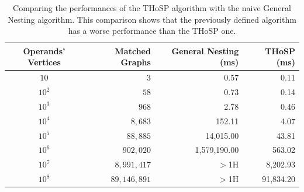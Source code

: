 \begin{table}[!t]
	\centering
\begin{tabular}{@{}cr|rr@{}}
	\toprule
	{\textbf{Operands' Vertices}} & Matched Graphs  & {\textbf{General Nesting} (ms)} & {\textbf{THoSP} (ms)}  \\	
	\midrule
	$10$ & $3$ &  0.57       & 0.11\\
	$10^2$ & $58$  & 0.73        & 0.14\\
	$10^3$  & $968$  & 2.78   & 0.46\\
	$10^4$ & $8,683$   & 152.11   & 4.07\\
	$10^5$ & $88,885$   & 14,015.00 & 43.81 \\
	$10^6$  & $902,020$  &  1,579,190.00      & 563.02\\
	$10^7$ & $8,991,417$   &  $>$1H      & 8,202.93\\
	$10^8$ & $89,146,891$   &  $>$1H      & 91,834.20\\
	\bottomrule
\end{tabular}
	\caption{Comparing the performances of the THoSP algorithm with the naive General Nesting algorithm. This comparison shows that the previously defined algorithm has a worse performance than the THoSP one. }
	\label{tab:comparisonTwo}
\end{table}



